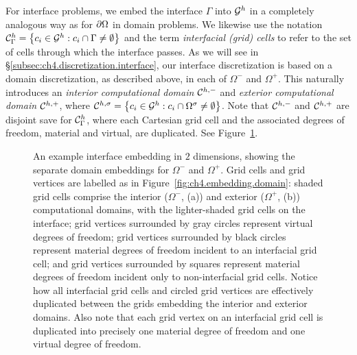 For interface problems, we embed the interface $\Gamma$ into $\mathcal{G}^h$ in a completely analogous way as for $\partial\Omega$ in domain problems. We likewise use the notation $\mathcal{C}_{\Gamma}^h = \left\lbrace  c_i \in \mathcal{G}^h : c_i \cap \Gamma \neq \emptyset  \right\rbrace$ and the term \emph{interfacial (grid) cells} to refer to the set of cells through which the interface passes. As we will see in \S\ref{subsec:ch4.discretization.interface}, our interface discretization is based on a domain discretization, as described above, in each of $\Omega^-$ and $\Omega^+$. This naturally introduces an \emph{interior computational domain} $\mathcal{C}^{h,-}$ and \emph{exterior computational domain} $\mathcal{C}^{h,+}$, where $\mathcal{C}^{h,\sigma} = \left\lbrace  c_i \in \mathcal{G}^h : c_i \cap \Omega^{\sigma} \neq \emptyset  \right\rbrace$. Note that $\mathcal{C}^{h,-}$ and $\mathcal{C}^{h,+}$ are disjoint save for $\mathcal{C}_{\Gamma}^h$, where each Cartesian grid cell and the associated degrees of freedom, material and virtual, are duplicated. See Figure~\ref{fig:ch4.embedding.interface}.

\setlength{\figureheight}{0.40\columnwidth}
\begin{figure}[htbp]
\begin{center}
\caption{An example interface embedding in $2$ dimensions, showing the separate domain embeddings for $\Omega^-$ and $\Omega^+$. Grid cells and grid vertices are labelled as in Figure~\ref{fig:ch4.embedding.domain}: shaded grid cells comprise the interior ($\Omega^-$, (a)) and exterior ($\Omega^+$, (b)) computational domains, with the lighter-shaded grid cells on the interface; grid vertices surrounded by gray circles represent virtual degrees of freedom; grid vertices surrounded by black circles represent material degrees of freedom incident to an interfacial grid cell; and grid vertices surrounded by squares represent material degrees of freedom incident only to non-interfacial grid cells. Notice how all interfacial grid cells and circled grid vertices are effectively duplicated between the grids embedding the interior and exterior domains. Also note that each grid vertex on an interfacial grid cell is duplicated into precisely one material degree of freedom and one virtual degree of freedom.}
\label{fig:ch4.embedding.interface}
\end{center}
\end{figure}

